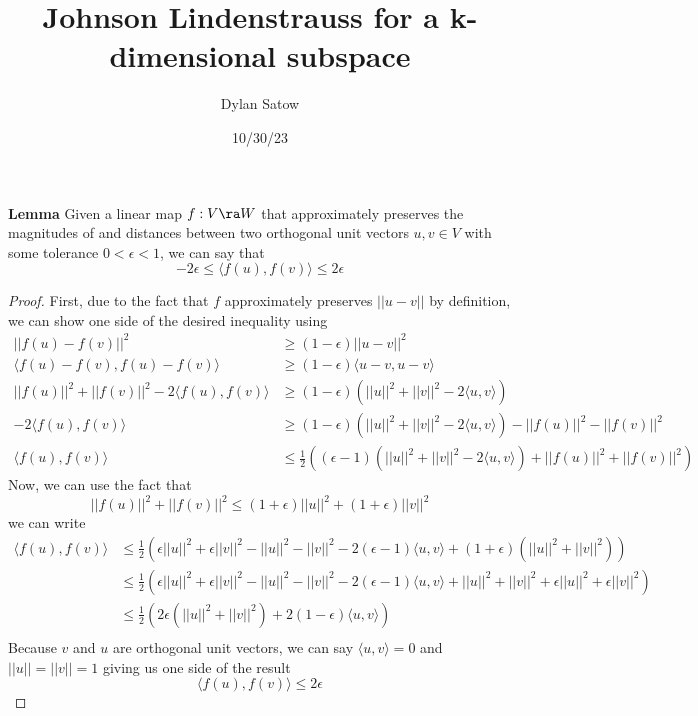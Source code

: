 \documentclass{article}
\author{Dylan Satow}
\date{10/30/23}
\title{Johnson Lindenstrauss for a k-dimensional subspace}
\newcommand{\innerproduct}[2]{\langle #1, #2 \rangle}
\begin{document}
\maketitle

\noindent\textbf{Lemma} Given a linear map $f: V \ra W$ that approximately preserves the magnitudes of 
and distances between two orthogonal unit vectors $u,v \in V$ with some tolerance $0<\epsilon<1$, we can say that 
\[ -2\epsilon \leq \innerproduct{f(u)}{f(v)} \leq 2\epsilon \]

\begin{proof}
    First, due to the fact that $f$ approximately preserves $||u-v||$ by definition, we can 
    show one side of the desired inequality using
    \begin{align*}
        ||f(u) - f(v)||^2 &\geq (1 - \epsilon)||u-v||^2   \\
        \innerproduct{f(u)-f(v)}{f(u) - f(v)} &\geq (1-\epsilon)\innerproduct{u-v}{u-v}  \\
        ||f(u)||^2 + ||f(v)||^2 - 2\innerproduct{f(u)}{f(v)} &\geq (1-\epsilon)(||u||^2+||v||^2-2\innerproduct{u}{v})  \\
        -2\innerproduct{f(u)}{f(v)} &\geq (1-\epsilon)(||u||^2+||v||^2-2\innerproduct{u}{v}) - ||f(u)||^2 - ||f(v)||^2 \\
        \innerproduct{f(u)}{f(v)} &\leq \frac{1}{2} ((\epsilon - 1)(||u||^2+||v||^2-2\innerproduct{u}{v}) +||f(u)||^2 + ||f(v)||^2)
    \end{align*}
    Now, we can use the fact that
    \[||f(u)||^2 + ||f(v)||^2 \leq (1+\epsilon)||u||^2 + (1+\epsilon)||v||^2\]
    we can write 
    \begin{align*}
        \innerproduct{f(u)}{f(v)} &\leq \frac{1}{2}(\epsilon||u||^2 + \epsilon||v||^2 - ||u||^2 - ||v||^2 - 2(\epsilon - 1)\innerproduct{u}{v} + (1+\epsilon)(||u||^2 + ||v||^2)) \\
        &\leq \frac{1}{2}(\epsilon||u||^2 + \epsilon||v||^2 - ||u||^2 - ||v||^2 - 2(\epsilon - 1)\innerproduct{u}{v} + ||u||^2 + ||v||^2 + \epsilon||u||^2 + \epsilon||v||^2) \\
        &\leq \frac{1}{2}(2\epsilon(||u||^2 + ||v||^2) + 2(1 - \epsilon)\innerproduct{u}{v}) \\
    \end{align*}
    Because $v$ and $u$ are orthogonal unit vectors, we can say $\innerproduct{u}{v} = 0$ and 
    $||u|| = ||v|| = 1$
    giving us one side of the result
    \[\innerproduct{f(u)}{f(v)} \leq 2\epsilon\]


\end{proof}
\end{document}
